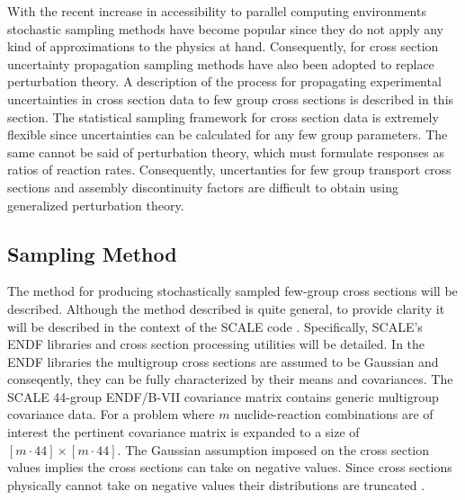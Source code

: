 With the recent increase in accessibility to parallel computing environments stochastic sampling methods have become popular since they do not apply any kind of approximations to the physics at hand. Consequently, for cross section uncertainty propagation sampling methods have also been adopted to replace perturbation theory. A description of the process for propagating experimental uncertainties in cross section data to few group cross sections is described in this section. The statistical sampling framework for cross section data is extremely flexible since uncertainties can be calculated for any few group parameters. The same cannot be said of perturbation theory, which must formulate responses as ratios of reaction rates. Consequently, uncertanties for few group transport cross sections and assembly discontinuity factors are difficult to obtain using generalized perturbation theory.   

\subsection{Sampling Method}
\label{subsec:xsec_sampling}

The method for producing stochastically sampled few-group cross sections will be described. Although the method described is quite general, to provide clarity it will be described in the context of the \ac{SCALE} code \cite{SCALE}. Specifically, \ac{SCALE}'s \ac{ENDF} libraries and cross section processing utilities will be detailed. In the \ac{ENDF} libraries the multigroup cross sections are assumed to be Gaussian and conseqently, they can be fully characterized by their means and covariances. The \ac{SCALE} 44-group \ac{ENDF}/B-VII covariance matrix contains generic multigroup covariance data. For a problem where $m$ nuclide-reaction combinations are of interest the pertinent covariance matrix is expanded to a size of $\left[m\cdot 44\right]\times \left[m\cdot 44\right]$. The Gaussian assumption imposed on the cross section values implies the cross sections can take on negative values. Since cross sections physically cannot take on negative values their distributions are truncated \cite{Klein_Gallner}.      

